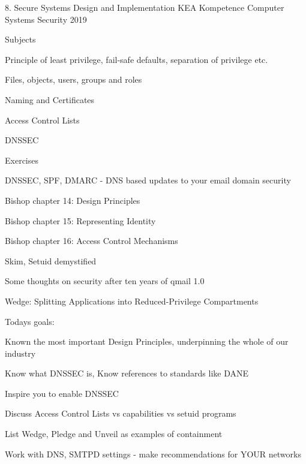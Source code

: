 \documentclass[Screen16to9,17pt]{foils}
\begin{document}
\mytitlepage
{8. Secure Systems Design and Implementation}
{KEA Kompetence Computer Systems Security 2019}



\begin{list1}
\item Subjects
\begin{list2}
\item Principle of least privilege, fail-safe defaults, separation of privilege etc.
\item Files, objects, users, groups and roles
\item Naming and Certificates
\item Access Control Lists
\item DNSSEC
\end{list2}
\item Exercises
\begin{list2}
\item DNSSEC, SPF, DMARC - DNS based updates to your email domain security
\end{list2}
\end{list1}




\begin{list1}
\item Bishop chapter 14: Design Principles
\item Bishop chapter 15: Representing Identity
\item Bishop chapter 16: Access Control Mechanisms
\item Skim, Setuid demystified
\item Some thoughts on security after ten years of qmail 1.0
\item Wedge: Splitting Applications into Reduced-Privilege Compartments
\end{list1}


Todays goals:
\begin{list2}
\item Known the most important Design Principles, underpinning the whole of our industry
\item Know what DNSSEC is, Know references to standards like DANE
\item Inspire you to enable DNSSEC
\item Discuss Access Control Lists vs capabilities vs setuid programs
\item List Wedge, Pledge and Unveil as examples of containment
\item Work with DNS, SMTPD settings - make recommendations for YOUR networks
\end{list2}
\end{document}
